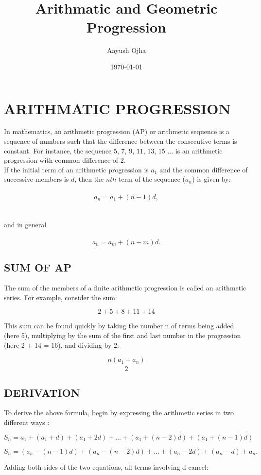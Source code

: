 \documentclass[11pt]{article}
\title{Arithmatic and Geometric Progression}
\author{Aayush Ojha}
\date{\today}
\begin{document}
\maketitle
\section{ARITHMATIC PROGRESSION}
In mathematics, an arithmetic progression (AP) or arithmetic sequence is a sequence of numbers such that the difference between the consecutive terms is constant. For instance, the sequence $5$, $7$, $9$, $11$, $13$, $15$ $\ldots$ is an arithmetic progression with common difference of $2$.\\
If the initial term of an arithmetic progression is $a_{1}$ and the common difference of successive members is $d$, then the $nth$ term of the sequence ($a_{n}$) is given by:\\
\\
$$ a_{n} = a_{1} + (n-1)d,$$\\
\\
and in general\\
\\
$$ a_{n} = a_{m} + (n - m)d.$$

\subsection{SUM OF AP}
The sum of the members of a finite arithmetic progression is called an arithmetic series. For example, consider the sum:

   $$2 + 5 + 8 + 11 + 14$$

This sum can be found quickly by taking the number n of terms being added (here 5), multiplying by the sum of the first and last number in the progression (here 2 + 14 = 16), and dividing by 2:

$$\frac{n(a_{1} + a_{n})}{2}$$

\subsection{DERIVATION}
To derive the above formula, begin by expressing the arithmetic series in two different ways \cite{Arith}:

$$ S_{n}=a_{1}+(a_{1}+d)+(a_{1}+2d)+\ldots+(a_{1}+(n-2)d)+(a_{1}+(n-1)d)$$

   $$ S_{n}=(a_{n}-(n-1)d)+(a_{n}-(n-2)d)+\ldots+(a_{n}-2d)+(a_{n}-d)+a_{n}.$$

Adding both sides of the two equations, all terms involving d cancel:
\end{document}

